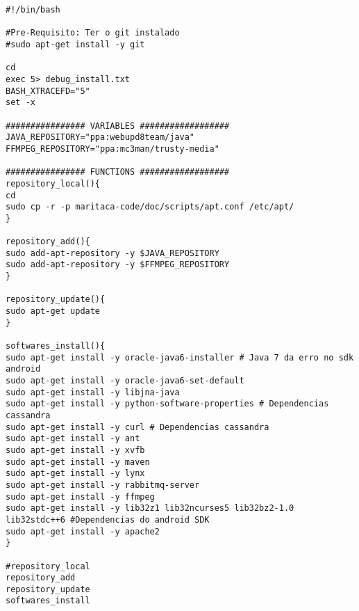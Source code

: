 \begin{lstlisting}[style=Bash]
#!/bin/bash

#Pre-Requisito: Ter o git instalado
#sudo apt-get install -y git

cd
exec 5> debug_install.txt
BASH_XTRACEFD="5"
set -x

################ VARIABLES ##################
JAVA_REPOSITORY="ppa:webupd8team/java"
FFMPEG_REPOSITORY="ppa:mc3man/trusty-media"

################ FUNCTIONS ##################
repository_local(){
cd
sudo cp -r -p maritaca-code/doc/scripts/apt.conf /etc/apt/
}

repository_add(){
sudo add-apt-repository -y $JAVA_REPOSITORY
sudo add-apt-repository -y $FFMPEG_REPOSITORY
}

repository_update(){
sudo apt-get update
}

softwares_install(){
sudo apt-get install -y oracle-java6-installer # Java 7 da erro no sdk android
sudo apt-get install -y oracle-java6-set-default
sudo apt-get install -y libjna-java
sudo apt-get install -y python-software-properties # Dependencias cassandra
sudo apt-get install -y curl # Dependencias cassandra
sudo apt-get install -y ant
sudo apt-get install -y xvfb
sudo apt-get install -y maven
sudo apt-get install -y lynx
sudo apt-get install -y rabbitmq-server
sudo apt-get install -y ffmpeg
sudo apt-get install -y lib32z1 lib32ncurses5 lib32bz2-1.0 lib32stdc++6 #Dependencias do android SDK
sudo apt-get install -y apache2
}

#repository_local
repository_add
repository_update
softwares_install
\end{lstlisting}